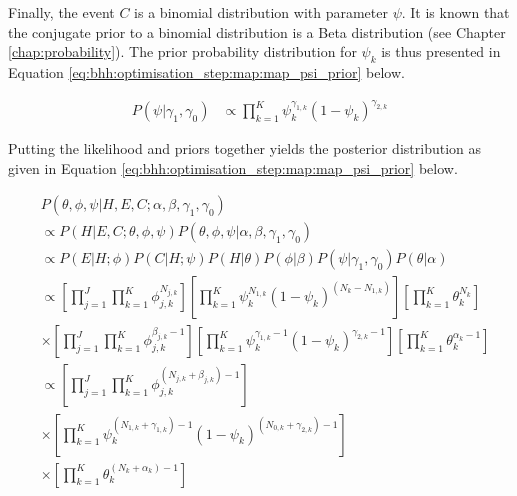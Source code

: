 Finally, the event $C$ is a binomial distribution with parameter $\psi$. It is known that the conjugate prior to a binomial distribution is a Beta distribution (see Chapter \ref{chap:probability}). The prior probability distribution for $\psi_{k}$ is thus presented in Equation \ref{eq:bhh:optimisation_step:map:map_psi_prior} below.

\begin{equation}
    \label{eq:bhh:optimisation_step:map:map_psi_prior}
    \begin{split}
        P(\psi | \gamma_{1}, \gamma_{0})
&\propto \prod_{k=1}^{K} \psi_{k}^{\gamma_{1,k}} (1- \psi_{k})^{\gamma_{2,k}}
    \end{split}
\end{equation}

Putting the likelihood and priors together yields the posterior distribution as given in Equation \ref{eq:bhh:optimisation_step:map:map_psi_prior} below.

\begin{equation}
    \label{eq:bhh:optimisation_step:map:posterior}
    \begin{split}
& P(\theta, \phi, \psi \vert H, E, C;  \alpha, \beta, \gamma_{1}, \gamma_{0}) \\
&\propto P(H \vert E, C; \theta, \phi, \psi)P(\theta, \phi, \psi \vert \alpha, \beta, \gamma_{1}, \gamma_{0}) \\
&\propto P(E \vert H; \phi) P(C \vert H; \psi) P(H \vert \theta) P(\phi \vert \beta) P(\psi \vert \gamma_{1}, \gamma_{0}) P(\theta \vert \alpha)  \\
&\propto \left[ \prod_{j=1}^{J} \prod_{k=1}^{K} \phi_{j,k}^{N_{j,k}} \right] \left[ \prod_{k=1}^{K} \psi_{k}^{N_{1,k}} (1 - \psi_{k})^{(N_{k} - N_{1,k})} \right] \left[ \prod_{k=1}^{K} \theta_{k}^{N_{k}} \right] \\
&\times \left[ \prod_{j=1}^{J} \prod_{k=1}^{K} \phi_{j,k}^{\beta_{j,k} - 1} \right] \left[ \prod_{k=1}^{K} \psi_{k}^{\gamma_{1,k} - 1} (1 - \psi_{k})^{\gamma_{2,k} - 1} \right] \left[ \prod_{k=1}^{K} \theta_{k}^{\alpha_{k} - 1} \right] \\
&\propto \left[ \prod_{j=1}^{J} \prod_{k=1}^{K} \phi_{j,k}^{(N_{j,k} + \beta_{j,k}) - 1} \right] \\
&\times \left[ \prod_{k=1}^{K} \psi_{k}^{(N_{1,k} + \gamma_{1,k}) - 1} (1 - \psi_{k})^{(N_{0,k} + \gamma_{2,k} )- 1} \right] \\
&\times \left[ \prod_{k=1}^{K} \theta_{k}^{(N_{k} + \alpha_{k}) - 1} \right]
    \end{split}
\end{equation}

